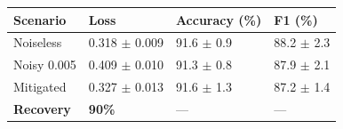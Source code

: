 \begin{tabular}{llll}
\toprule
Scenario & Loss & Accuracy (\%) & F1 (\%) \\
\midrule
Noiseless & 0.318 $\pm$ 0.009 & 91.6 $\pm$ 0.9 & 88.2 $\pm$ 2.3 \\
Noisy 0.005 & 0.409 $\pm$ 0.010 & 91.3 $\pm$ 0.8 & 87.9 $\pm$ 2.1 \\
Mitigated & 0.327 $\pm$ 0.013 & 91.6 $\pm$ 1.3 & 87.2 $\pm$ 1.4 \\
\textbf{Recovery} & \textbf{90\%} & --- & --- \\
\bottomrule
\end{tabular}
